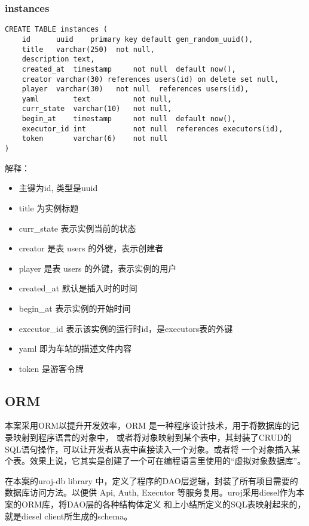 \subsubsection{instances}
\begin{lstlisting}
CREATE TABLE instances (
    id      uuid    primary key default gen_random_uuid(),
    title   varchar(250)  not null,
    description text,
    created_at  timestamp     not null  default now(),
    creator varchar(30) references users(id) on delete set null,
    player  varchar(30)   not null  references users(id),    
    yaml        text          not null,
    curr_state  varchar(10)   not null,
    begin_at    timestamp     not null  default now(),
    executor_id int           not null  references executors(id),
    token       varchar(6)    not null
)
\end{lstlisting}
解释：
\begin{itemize}
    \item 主键为id, 类型是uuid
    \item title 为实例标题
    \item curr\_state 表示实例当前的状态
    \item creator 是表 users 的外键，表示创建者
    \item player 是表 users 的外键，表示实例的用户
    \item created\_at  默认是插入时的时间
    \item begin\_at 表示实例的开始时间
    \item executor\_id 表示该实例的运行时id，是executors表的外键
    \item yaml 即为车站的描述文件内容
    \item token 是游客令牌
\end{itemize}

\subsection{ORM}
本案采用ORM以提升开发效率，ORM 是一种程序设计技术，用于将数据库的记录映射到程序语言的对象中，
或者将对象映射到某个表中，其封装了CRUD的SQL语句操作，可以让开发者从表中直接读入一个对象。或者将
一个对象插入某个表。效果上说，它其实是创建了一个可在编程语言里使用的“虚拟对象数据库”。

在本案的uroj-db library 中，定义了程序的DAO层逻辑，封装了所有项目需要的数据库访问方法。以便供
Api, Auth, Executor 等服务复用。uroj采用diesel作为本案的ORM库，将DAO层的各种结构体定义
和上小结所定义的SQL表映射起来的，就是diesel client所生成的schema。

